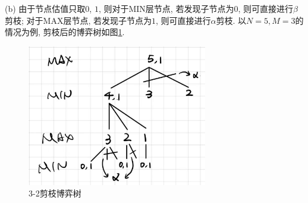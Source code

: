 (b) 由于节点估值只取$0$, $1$, 则对于MIN层节点, 若发现子节点为$0$, 则可直接进行$\beta$剪枝; 对于MAX层节点, 
若发现子节点为$1$, 则可直接进行$\alpha$剪枝. 以$N=5,M=3$的情况为例, 剪枝后的博弈树如图\ref{fig:3-2(2)}.

\begin{figure}[htbp]
    \centering
    \includegraphics[width=0.7\textwidth]{images/3-2(2).jpg}
    \caption{3-2剪枝博弈树}\label{fig:3-2(2)}
\end{figure}